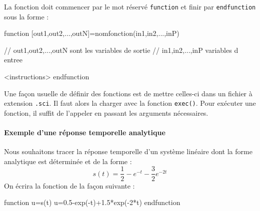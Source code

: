La fonction doit commencer par le mot réservé \verb?function? et finir par 
\verb?endfunction? sous la forme :
\begin{Scilabcode}
function [out1,out2,...,outN]=nomfonction(in1,in2,...,inP)

  // out1,out2,...,outN sont les variables de sortie
  // in1,in2,...,inP variables d entree
          
<instructions>
endfunction
\end{Scilabcode}

Une façon usuelle de définir des fonctions est de mettre 
celles-ci dans un fichier à extension \verb?.sci?. 
Il faut alors la charger avec la fonction \verb?exec()?.
Pour exécuter une fonction, il suffit de l'appeler en passant les 
arguments nécessaires.

\paragraph{Exemple d'une réponse temporelle analytique}
Nous souhaitons tracer la réponse temporelle d'un système linéaire dont la
forme analytique est déterminée et de la forme :
$$
s(t)=\dfrac{1}{2}-e^{-t}-\dfrac{3}{2}e^{-2t}
$$
On écrira la fonction de la façon suivante :
\begin{Scilabcode}
function u=s(t)
    u=0.5-exp(-t)+1.5*exp(-2*t)
endfunction
\end{Scilabcode}

